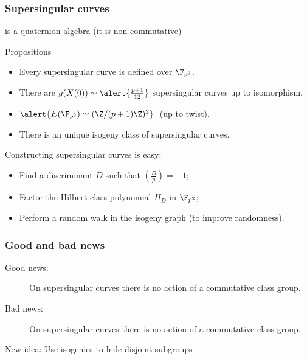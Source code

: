 \documentclass{beamer}
\renewcommand{\emph}[1]{}
\begin{document}
\begin{frame}
  \frametitle{Supersingular curves}

  \emph{$\Q\otimes\End(E)$} is a quaternion algebra (it is non-commutative)

  \begin{block}{Propositions}
    \begin{itemize}
    \item Every supersingular curve is defined over \alert{$\F_{p^2}$}.
    \item There are $g(X(0)) \sim\alert{\frac{p+1}{12}}$ supersingular curves
      up to isomorphism.
    \item $\alert{E(\F_{p^2}) \simeq (\Z/(p+1)\Z)^2}\;$ (up to twist).
    \item There is an \alert{unique isogeny class} of supersingular
      curves.
    \end{itemize}
  \end{block}

  Constructing supersingular curves is easy:
  \begin{itemize}
  \item Find a discriminant $D$ such that $\left(\frac{D}{p}\right)=-1$;
  \item Factor the Hilbert class polynomial $H_D$ in $\F_{p^2}$;
  \item Perform a random walk in the isogeny graph (to improve randomness).
  \end{itemize}
\end{frame}


\begin{frame}
  \frametitle{Good and bad news}
  
  \begin{description}
  \item[Good news:] On supersingular curves there is no action of a
    commutative class group.
  \item[Bad news:] On supersingular curves there is no action of a
    commutative class group.
  \end{description}

  \alert{New idea:} Use isogenies to hide disjoint subgroups
  \emph{$G,H\subset E$}

  \begin{center}
  \end{center}
\end{frame}
\end{document}
